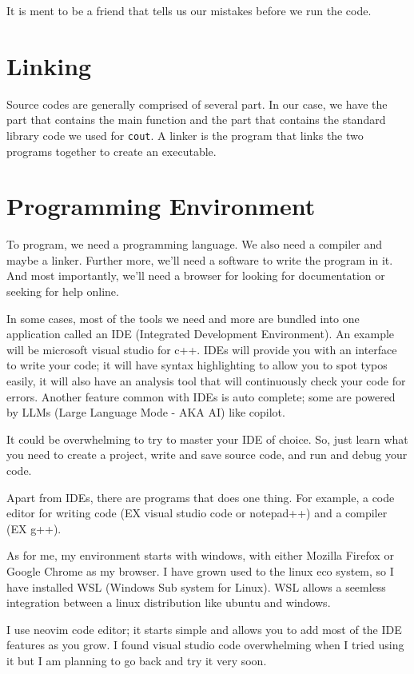 \documentclass{book}
\begin{document}
It is ment to be a friend that tells us our mistakes before we run the code.

\section{Linking}
Source codes are generally comprised of several part. In our case, we have the part that contains the main function and the part that contains the standard library code we used for \verb|cout|. A linker is the program that links the two programs together to create an executable.

\section{Programming Environment}
To program, we need a programming language. We also need a compiler and maybe a linker. Further more, we'll need a software to write the program in it. And most importantly, we'll need a browser for looking for documentation or seeking for help online.

In some cases, most of the tools we need and more are bundled into one application called an IDE (Integrated Development Environment). An example will be microsoft visual studio for c++. IDEs will provide you with an interface to write your code; it will have syntax highlighting to allow you to spot typos easily, it will also have an analysis tool that will continuously check your code for errors. Another feature common with IDEs is auto complete; some are powered by LLMs (Large Language Mode - AKA AI) like copilot.

It could be overwhelming to try to master your IDE of choice. So, just learn what you need to create a project, write and save source code, and run and debug your code.

Apart from IDEs, there are programs that does one thing. For example, a code editor for writing code (EX visual studio code or notepad++) and a compiler (EX g++).

As for me, my environment starts with windows, with either Mozilla Firefox or Google Chrome as my browser. I have grown used to the linux eco system, so I have installed WSL (Windows Sub system for Linux). WSL allows a seemless integration between a linux distribution like ubuntu and windows.

I use neovim code editor; it starts simple and allows you to add most of the IDE features as you grow. I found visual studio code overwhelming when I tried using it but I am planning to go back and try it very soon.
\end{document}
